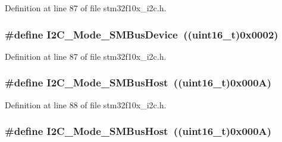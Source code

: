 Definition at line 87 of file stm32f10x\+\_\+i2c.\+h.

\subsubsection[{\texorpdfstring{I2\+C\+\_\+\+Mode\+\_\+\+S\+M\+Bus\+Device}{I2C_Mode_SMBusDevice}}]{\setlength{\rightskip}{0pt plus 5cm}\#define I2\+C\+\_\+\+Mode\+\_\+\+S\+M\+Bus\+Device~(({\bf uint16\+\_\+t})0x0002)}\hypertarget{group___i2_c__mode_gaf0cf66bc1f4986ba8a9925da924e06da}{}\label{group___i2_c__mode_gaf0cf66bc1f4986ba8a9925da924e06da}


Definition at line 87 of file stm32f10x\+\_\+i2c.\+h.

\subsubsection[{\texorpdfstring{I2\+C\+\_\+\+Mode\+\_\+\+S\+M\+Bus\+Host}{I2C_Mode_SMBusHost}}]{\setlength{\rightskip}{0pt plus 5cm}\#define I2\+C\+\_\+\+Mode\+\_\+\+S\+M\+Bus\+Host~(({\bf uint16\+\_\+t})0x000\+A)}\hypertarget{group___i2_c__mode_gacfd37619c8d91dea5dec2921840acede}{}\label{group___i2_c__mode_gacfd37619c8d91dea5dec2921840acede}


Definition at line 88 of file stm32f10x\+\_\+i2c.\+h.

\subsubsection[{\texorpdfstring{I2\+C\+\_\+\+Mode\+\_\+\+S\+M\+Bus\+Host}{I2C_Mode_SMBusHost}}]{\setlength{\rightskip}{0pt plus 5cm}\#define I2\+C\+\_\+\+Mode\+\_\+\+S\+M\+Bus\+Host~(({\bf uint16\+\_\+t})0x000\+A)}\hypertarget{group___i2_c__mode_gacfd37619c8d91dea5dec2921840acede}{}\label{group___i2_c__mode_gacfd37619c8d91dea5dec2921840acede}


